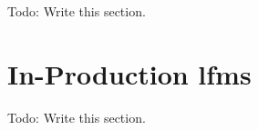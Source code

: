 Todo: Write this section.


\section{In-Production \acl{lfms}} \label{sec:on-production-solutions}

Todo: Write this section.



